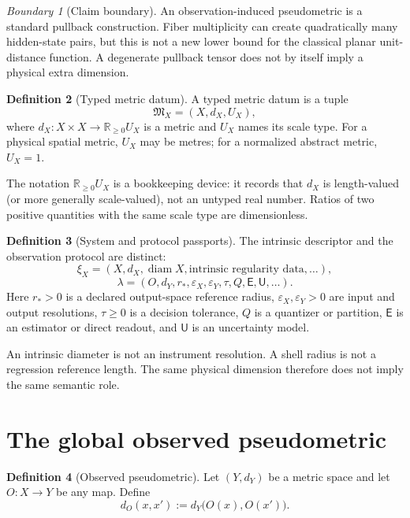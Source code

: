 \documentclass[11pt,a4paper]{article}
\theoremstyle{definition}
\newtheorem{definition}{Definition}[section]
\theoremstyle{plain}
\theoremstyle{remark}
\newtheorem{warning}[definition]{Boundary}
\newcommand{\R}{\mathbb{R}}
\newcommand{\diam}{\operatorname{diam}}
\begin{document}
\begin{warning}[Claim boundary]
An observation-induced pseudometric is a standard pullback construction.
Fiber multiplicity can create quadratically many hidden-state pairs, but
this is not a new lower bound for the classical planar unit-distance
function. A degenerate pullback tensor does not by itself imply a physical
extra dimension.
\end{warning}

\begin{definition}[Typed metric datum]
A typed metric datum is a tuple
\[
  \mathfrak M_X=(X,d_X,U_X),
\]
where $d_X:X\times X\to\R_{\geq0}U_X$ is a metric and $U_X$ names its
scale type. For a physical spatial metric, $U_X$ may be metres; for a
normalized abstract metric, $U_X=1$.
\end{definition}

The notation $\R_{\geq0}U_X$ is a bookkeeping device: it records that
$d_X$ is length-valued (or more generally scale-valued), not an
untyped real number. Ratios of two positive quantities with the same
scale type are dimensionless.

\begin{definition}[System and protocol passports]
The intrinsic descriptor and the observation protocol are distinct:
\[
 \xi_X=(X,d_X,\diam X,\text{intrinsic regularity data},\ldots),
\]
\[
 \lambda=(O,d_Y,r_*,\varepsilon_X,\varepsilon_Y,\tau,
          Q,\mathsf E,\mathsf U,\ldots).
\]
Here $r_*>0$ is a declared output-space reference radius,
$\varepsilon_X,\varepsilon_Y>0$ are input and output resolutions,
$\tau\geq0$ is a decision tolerance, $Q$ is a quantizer or partition,
$\mathsf E$ is an estimator or direct readout, and $\mathsf U$ is an
uncertainty model.
\end{definition}

An intrinsic diameter is not an instrument resolution. A shell radius is
not a regression reference length. The same physical dimension therefore
does not imply the same semantic role.

\section{The global observed pseudometric}

\begin{definition}[Observed pseudometric]
Let $(Y,d_Y)$ be a metric space and let $O:X\to Y$ be any map. Define
\[
  d_O(x,x'):=d_Y\bigl(O(x),O(x')\bigr).
\]
\end{definition}
\end{document}
